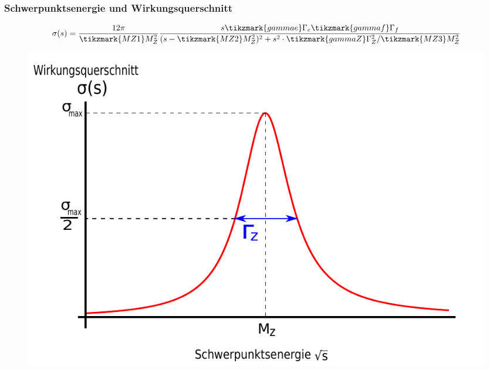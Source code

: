 \begin{frame}
	\frametitle{Schwerpunktsenergie und Wirkungsquerschnitt}
	\begin{equation*}
	\sigma(s) = \frac{12\pi}{ \tikzmark{MZ1}M_Z^2}
	\frac{s\tikzmark{gammae}\Gamma_e \tikzmark{gammaf}\Gamma_f}{(s-\tikzmark{MZ2}M_Z^2)^2 + s^2\cdot\tikzmark{gammaZ}\Gamma_Z^2 / \tikzmark{MZ3}M_Z^2}
	\end{equation*}
	\begin{figure}
		\includegraphics[width=0.75\linewidth]{graphics/Breit-Wigner}
	\end{figure}
\end{frame}
